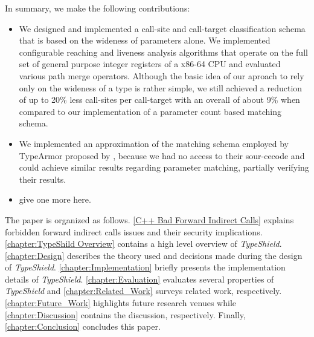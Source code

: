 In summary, we make the following contributions:
\label{Contribution}
\begin{itemize}
 \item We designed and implemented a call-site and call-target classification schema
 that is based on the wideness of parameters alone. We implemented configurable reaching and liveness analysis algorithms
 that operate on the full set of general purpose integer registers of a x86-64 CPU and evaluated various path merge operators.
 Although the basic idea of our aproach to rely only on the wideness of a type is rather simple, we still achieved a reduction
 of up to 20\% less call-sites per call-target with an overall of about 9\% when compared to our implementation of a parameter
 count based matching schema.

 \item We implemented an approximation of the matching schema employed by TypeArmor proposed by \cite{veen:typearmor}, 
 because we had no access to their sour-cecode and could achieve similar results regarding parameter matching, partially verifying
 their results.
 
 \item give one more here.
  
\end{itemize}

\label{Outline}
The paper is organized as follows.
\cref{C++ Bad Forward Indirect Calls} explains forbidden forward indirect calls issues and their security implications.
\cref{chapter:TypeShild Overview} contains a high level overview of \textit{TypeShield}.
\cref{chapter:Design} describes the theory used and decisions made during the design of \textit{TypeShield}.
\cref{chapter:Implementation} briefly presents the implementation details of \textit{TypeShield}.
\cref{chapter:Evaluation} evaluates several properties of \textit{TypeShield} and
\cref{chapter:Related_Work} surveys related work, respectively.
\cref{chapter:Future_Work} highlights future research venues while 
\cref{chapter:Discussion} contains the discussion, respectively.
Finally, \cref{chapter:Conclusion} concludes this paper.


